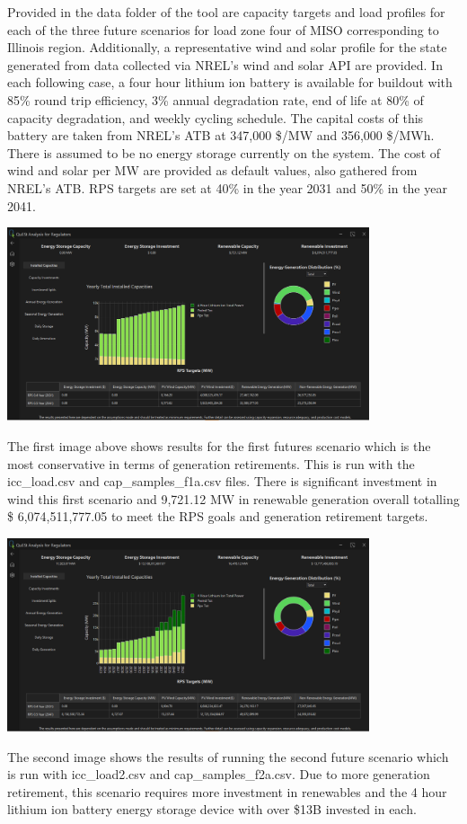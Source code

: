 \documentclass{article}
\begin{document}
Provided in the data folder of the tool are capacity targets and load profiles for each of the three future scenarios for load zone four of MISO corresponding to Illinois region. Additionally, a representative wind and solar profile for the state generated from data collected via NREL's wind and solar API are provided. In each following case, a four hour lithium ion battery is available for buildout with 85\% round trip efficiency, 3\% annual degradation rate, end of life at 80\% of capacity degradation, and weekly cycling schedule. The capital costs of this battery are taken from NREL's ATB at 347,000 \$/MW and 356,000 \$/MWh. There is assumed to be no energy storage currently on the system. The cost of wind and solar per MW are provided as default values, also gathered from NREL's ATB. RPS targets are set at 40\% in the year 2031 and 50\% in the year 2041.
\begin{center}
    \includegraphics[width=0.8\textwidth]{pics/results_1.PNG}
\end{center}
The first image above shows results for the first futures scenario which is the most conservative in terms of generation retirements. This is run with the icc\_load.csv and cap\_samples\_f1a.csv files. There is significant investment in wind this first scenario and 9,721.12 MW in renewable generation overall totalling \$ 6,074,511,777.05 to meet the RPS goals and generation retirement targets. 

\begin{center}
    \includegraphics[width=0.8\textwidth]{pics/results_2.PNG}
\end{center}
The second image shows the results of running the second future scenario which is run with icc\_load2.csv and cap\_samples\_f2a.csv. Due to more generation retirement, this scenario requires more investment in renewables and the 4 hour lithium ion battery energy storage device with over \$13B invested in each. 
\end{document}
